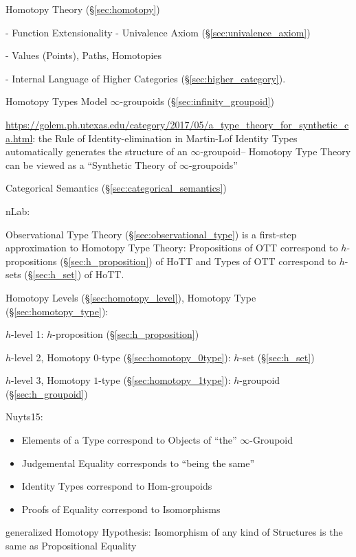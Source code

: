 Homotopy Theory (\S\ref{sec:homotopy})

- Function Extensionality
- Univalence Axiom (\S\ref{sec:univalence_axiom})

- Values (Points), Paths, Homotopies

- Internal Language of Higher Categories
(\S\ref{sec:higher_category}).

Homotopy Types Model $\infty$-groupoids
(\S\ref{sec:infinity_groupoid})

\url{https://golem.ph.utexas.edu/category/2017/05/a_type_theory_for_synthetic_ca.html}:
the Rule of Identity-elimination in Martin-Lof Identity Types
automatically generates the structure of an $\infty$-groupoid--
Homotopy Type Theory can be viewed as a ``Synthetic Theory of
$\infty$-groupoids''

Categorical Semantics (\S\ref{sec:categorical_semantics})

nLab:

Observational Type Theory (\S\ref{sec:observational_type}) is a
first-step approximation to Homotopy Type Theory: Propositions of OTT
correspond to $h$-propositions (\S\ref{sec:h_proposition}) of HoTT and
Types of OTT correspond to $h$-sets (\S\ref{sec:h_set}) of HoTT.

Homotopy Levels (\S\ref{sec:homotopy_level}), Homotopy Type
(\S\ref{sec:homotopy_type}):

$h$-level 1: $h$-proposition (\S\ref{sec:h_proposition})

$h$-level 2, Homotopy $0$-type (\S\ref{sec:homotopy_0type}): $h$-set
(\S\ref{sec:h_set})

$h$-level 3, Homotopy $1$-type (\S\ref{sec:homotopy_1type}):
$h$-groupoid (\S\ref{sec:h_groupoid})


Nuyts15:

\begin{itemize}
  \item Elements of a Type correspond to Objects of ``the''
    $\infty$-Groupoid
  \item Judgemental Equality corresponds to ``being the same''
  \item Identity Types correspond to Hom-groupoids
  \item Proofs of Equality correspond to Isomorphisms
\end{itemize}

generalized Homotopy Hypothesis: Isomorphism of any kind of Structures
is the same as Propositional Equality



